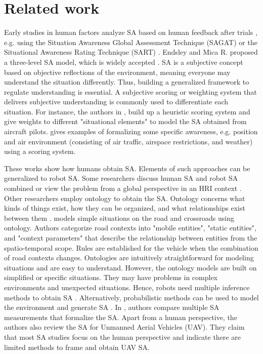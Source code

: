 \section{Related work}
Early studies in human factors analyze SA based on human feedback after trials \cite{stanton2017state}, e.g. using the Situation Awareness Global Assessment Technique (SAGAT) \cite{endsley1988situation} or the Situational Awareness Rating Technique (SART) \cite{taylor2017situational}. Endsley and Mica R. proposed a three-level SA model, which is widely accepted \cite{endsley1995measurement}. SA is a subjective concept based on objective reflections of the environment, meaning everyone may understand the situation differently. Thus, building a generalized framework to regulate understanding is essential. A subjective scoring or weighting system that delivers subjective understanding is commonly used to differentiate each situation. For instance, the authors in \cite{hooey2011modeling}, build up a heuristic scoring system and give weights to different "situational elements" to model the SA obtained from aircraft pilots. \cite{mcaree2018quantifying} gives examples of formalizing some specific awareness, e.g. position and air environment (consisting of air traffic, airspace restrictions, and weather) using a scoring system. 

These works show how humans obtain SA. Elements of such approaches can be generalized to robot SA. Some researchers discuss human SA and robot SA combined or view the problem from a global perspective in an HRI context \cite{dini2017measurement}. 
Other researchers employ ontology to obtain the SA. Ontology concerns what kinds of things exist, how they can be organized, and what relationships exist between them \cite{huang2019ontology,tenorth2017representations}. \cite{armand2014ontology} models simple situations on the road and crossroads using ontology. Authors categorize road contexts into "mobile entities", "static entities", and "context parameters" that describe the relationship between entities from the spatio-temporal scope. Rules are established for the vehicle when the combination of road contexts changes. Ontologies are intuitively straightforward for modeling situations and are easy to understand. However, the ontology models are built on simplified or specific situations. They may have problems in complex environments and unexpected situations. Hence, robots need multiple inference methods to obtain SA \cite{tenorth2017representations}. Alternatively, probabilistic methods can be used to model the environment and generate SA \cite{shuang2014quantitative}. In \cite{nguyen2019review}, authors compare multiple SA measurements that formalize the SA. Apart from a human perspective, the authors also review the SA for Unmanned Aerial Vehicles (UAV). They claim that most SA studies focus on the human perspective and indicate there are limited methods to frame and obtain UAV SA. 


